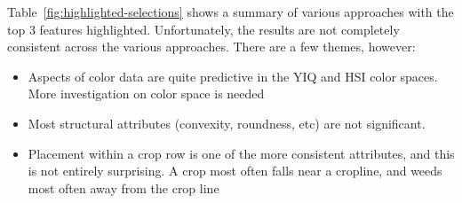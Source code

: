 \documentclass[letterpaper]{article}
\begin{document}
{Table~\ref{fig:highlighted-selections} shows a summary of various approaches with the top 3 features highlighted. Unfortunately, the results are not completely consistent across the various approaches. There are a few themes, however:
\begin{itemize}
\item{Aspects of color data are quite predictive in the YIQ and HSI color spaces. More investigation on color space is needed}
\item{Most structural attributes (convexity, roundness, etc) are not significant.}
\item{Placement within a crop row is one of the more consistent attributes, and this is not entirely surprising. A crop most often falls near a cropline, and weeds most often away from the crop line}
\end{itemize}



}
\end{document}
